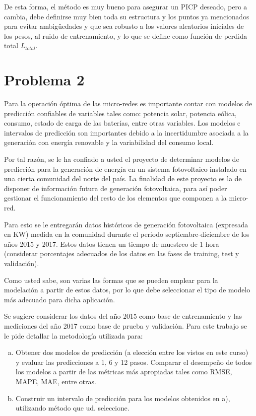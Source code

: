 \documentclass[12pt]{article}
\begin{document}
	De esta forma, el método es muy bueno para asegurar un PICP deseado, pero a cambia, debe definirse muy bien toda su estructura y los puntos ya mencionados para evitar ambigüedades y que sea robusto a los valores aleatorios iniciales de los pesos, al ruido de entrenamiento, y lo que se define como función de perdida total $L_{total}$. 
\clearpage
\newpage
\section{Problema 2}
Para la operación óptima de las micro-redes es importante contar con modelos de predicción confiables de variables tales como: potencia solar, potencia eólica, consumo, estado de carga de las baterías, entre otras variables. Los modelos e intervalos de predicción son importantes debido a la incertidumbre asociada a la generación con energía renovable y la variabilidad del consumo local.

Por tal razón, se le ha confiado a usted el proyecto de determinar modelos de predicción para la generación de energía en un sistema fotovoltaico instalado en una cierta comunidad del norte del país. La finalidad de este proyecto es la de disponer de información futura de generación fotovoltaica, para así poder gestionar el funcionamiento del resto de los elementos que componen a la micro-red.

Para esto se le entregarán datos históricos de generación fotovoltaica (expresada en KW) medida en la comunidad durante el periodo septiembre-diciembre de los años 2015 y 2017. Estos datos tienen un tiempo de muestreo de 1 hora (considerar porcentajes adecuados de los datos en las fases de training, test y validación).

Como usted sabe, son varias las formas que se pueden emplear para la modelación a partir de estos datos, por lo que debe seleccionar el tipo de modelo más adecuado para dicha aplicación.

Se sugiere considerar los datos del año 2015 como base de entrenamiento y las mediciones del año 2017 como base de prueba y validación. Para este trabajo se le pide detallar la metodología utilizada para:

\begin{enumerate}[a)]
  \item Obtener dos modelos de predicción (a elección entre los vistos en este curso) y evaluar las predicciones a 1, 6 y 12 pasos. Comparar el desempeño de todos los modelos a partir de las métricas más apropiadas tales como RMSE, MAPE, MAE, entre otras.
  \item Construir un intervalo de predicción para los modelos obtenidos en a), utilizando método que ud. seleccione.
\end{enumerate}
\end{document}

